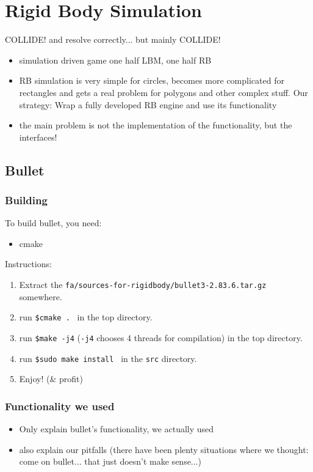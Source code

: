 \section{Rigid Body Simulation}

COLLIDE! and resolve correctly... but mainly COLLIDE!

\begin{itemize}
\item simulation driven game one half LBM, one half RB
\item RB simulation is very simple for circles, becomes more complicated for rectangles and gets a real problem for polygons and other complex stuff. Our strategy: Wrap a fully developed RB engine and use its functionality
\item the main problem is not the implementation of the functionality, but the interfaces!
\end{itemize}

\subsection{Bullet}
\subsubsection{Building}
To build bullet, you need:
\begin{itemize}
\item cmake
\end{itemize}
Instructions:
\begin{enumerate}
\item Extract the \verb+fa/sources-for-rigidbody/bullet3-2.83.6.tar.gz + somewhere.
\item run \verb+$cmake . + in the top directory.
\item run \verb+$make -j4+ (\verb+-j4+ chooses 4 threads for compilation) in the top directory.
\item run \verb+$sudo make install + in the \verb+src+ directory.
\item Enjoy! (\& profit)
\end{enumerate}
\subsubsection{Functionality we used}
\begin{itemize}
\item Only explain bullet's functionality, we actually used
\item also explain our pitfalls (there have been plenty situations where we thought: come on bullet... that just doesn't make sense...)
\end{itemize}

